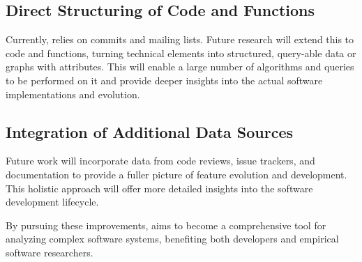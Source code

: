 \subsection{Direct Structuring of Code and Functions}

Currently, \emph{\sys} relies on commits and mailing lists. Future research will extend this to code and functions, turning technical elements into structured, query-able data or graphs with attributes. This will enable a large number of algorithms and queries to be performed on it and provide deeper insights into the actual software implementations and evolution.

\subsection{Integration of Additional Data Sources}

Future work will incorporate data from code reviews, issue trackers, and documentation to provide a fuller picture of feature evolution and development. This holistic approach will offer more detailed insights into the software development lifecycle.

By pursuing these improvements, \emph{\sys} aims to become a comprehensive tool for analyzing complex software systems, benefiting both developers and empirical software researchers.
